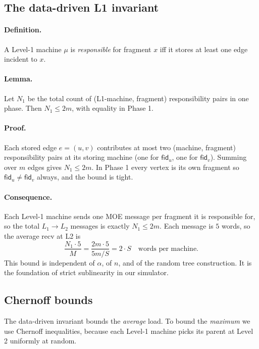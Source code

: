 \documentclass[11pt]{article}
\begin{document}
\subsection{The data-driven L1 invariant}

\paragraph{Definition.} A Level-1 machine $\mu$ is \textit{responsible} for
fragment $x$ iff it stores at least one edge incident to $x$.

\paragraph{Lemma.} Let $N_1$ be the total count of (L1-machine, fragment)
responsibility pairs in one phase. Then $N_1 \le 2m$, with equality in Phase 1.

\paragraph{Proof.} Each stored edge $e = (u, v)$ contributes at most two
(machine, fragment) responsibility pairs at its storing machine
(one for $\textsf{fid}_u$, one for $\textsf{fid}_v$). Summing over $m$ edges
gives $N_1 \le 2m$. In Phase 1 every vertex is its own fragment so
$\textsf{fid}_u \ne \textsf{fid}_v$ always, and the bound is tight.

\paragraph{Consequence.} Each Level-1 machine sends one MOE message per
fragment it is responsible for, so the total $L_1 \to L_2$ messages is
exactly $N_1 \le 2m$. Each message is $5$ words, so the average recv at L2
is
\[
    \frac{N_1 \cdot 5}{M} = \frac{2m \cdot 5}{5m/S} = 2 \cdot S
    \quad \text{words per machine.}
\]
This bound is independent of $\alpha$, of $n$, and of the random tree
construction. It is the foundation of strict sublinearity in our simulator.

\subsection{Chernoff bounds}
\label{sec:chernoff}

The data-driven invariant bounds the \textit{average} load. To bound the
\textit{maximum} we use Chernoff inequalities, because each Level-1 machine
picks its parent at Level 2 uniformly at random.
\end{document}
